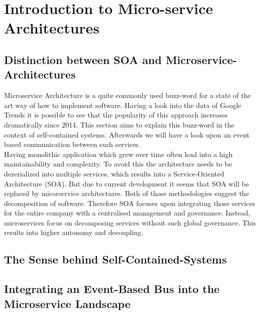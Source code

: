 \section{Introduction to Micro-service Architectures}
\label{sec:techKnowHow}

\subsection{Distinction between SOA and Microservice-Architectures}
Microservice Architecture is a quite commonly used buzz-word for a state of the art way of how to implement software. Having a look into the data of Google Trends it is possible to see that the popularity of this approach increases dramatically since 2014. \cite{microservices}\newline
This section aims to explain this buzz-word in the context of self-contained systems. Afterwards we will have a look upon an event based communication between such services.\newline
\\
Having monolithic application which grew over time often lead into a high maintainability and complexity. To avoid this the architecture needs to be dezerialized into multiple services, which results into a Service-Oriented Architecture (SOA). But due to current development it seems that SOA will be replaced by micorservice architectures.\cite{mircorVSsoa}\newline
Both of those methodologies suggest the decomposition of software. Therefore SOA focuses upon integrating those services for the entire company with a centralised management and governance. Instead, microservices focus on decomposing services without such global governance. This results into higher autonomy and decoupling.\cite{mircorVSsoa}\newline


\subsection{The Sense behind Self-Contained-Systems}


\subsection{Integrating an Event-Based Bus into the Microservice Landscape}
